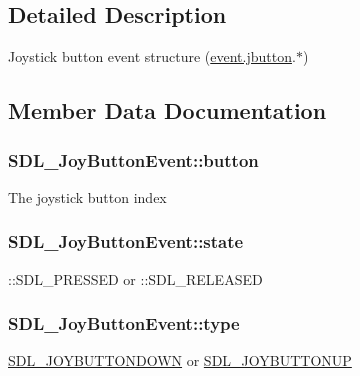 \subsection{Detailed Description}
Joystick button event structure (\hyperlink{unionSDL__Event_a591104d64903ae1cf70874fb5d3124ff}{event.\+jbutton}.$\ast$) 

\subsection{Member Data Documentation}
\hypertarget{structSDL__JoyButtonEvent_a73ebe4261cf80564052af9c1af737a4d}{}
\subsubsection[{button}]{ S\+D\+L\+\_\+\+Joy\+Button\+Event\+::button}\label{structSDL__JoyButtonEvent_a73ebe4261cf80564052af9c1af737a4d}
The joystick button index \hypertarget{structSDL__JoyButtonEvent_ad3b6f8d9aa2c5e694f664b97d12bcd2b}{}
\subsubsection[{state}]{ S\+D\+L\+\_\+\+Joy\+Button\+Event\+::state}\label{structSDL__JoyButtonEvent_ad3b6f8d9aa2c5e694f664b97d12bcd2b}
\+::\+S\+D\+L\+\_\+\+P\+R\+E\+S\+S\+E\+D or \+::\+S\+D\+L\+\_\+\+R\+E\+L\+E\+A\+S\+E\+D \hypertarget{structSDL__JoyButtonEvent_a8f3312a046d37fa2884b93f69c4cb655}{}
\subsubsection[{type}]{ S\+D\+L\+\_\+\+Joy\+Button\+Event\+::type}\label{structSDL__JoyButtonEvent_a8f3312a046d37fa2884b93f69c4cb655}
\hyperlink{SDL__events_8h_a3b589e89be6b35c02e0dd34a55f3fccaa386ac978bc145a45883fe0adab70710b}{S\+D\+L\+\_\+\+J\+O\+Y\+B\+U\+T\+T\+O\+N\+D\+O\+W\+N} or \hyperlink{SDL__events_8h_a3b589e89be6b35c02e0dd34a55f3fccaa76f91c81110f012e3a47cbbc0449e3c3}{S\+D\+L\+\_\+\+J\+O\+Y\+B\+U\+T\+T\+O\+N\+U\+P} \hypertarget{structSDL__JoyButtonEvent_a1679049adad7242b28420948fdc79044}{}
